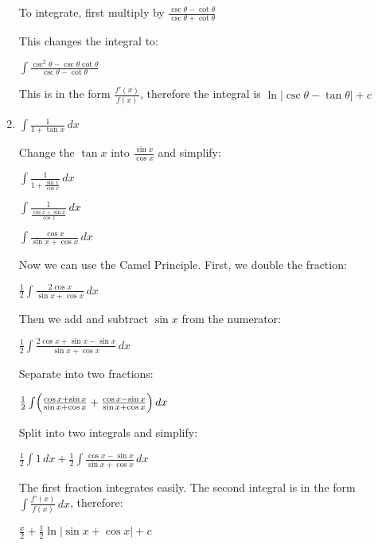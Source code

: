 \documentclass[../main.tex]{subfiles}
\begin{document}
\begin{enumerate}
    To integrate, first multiply by \(\frac{\csc{\theta}-\cot{\theta}}{\csc{\theta}+\cot{\theta}}\)

    This changes the integral to:

    \(\int \frac{\csc^2{\theta}-\csc{\theta}\cot{\theta}}{\csc{\theta}-\cot{\theta}}\)

    This is in the form \(\frac{f'(x)}{f(x)}\), therefore the integral is \(\ln{|\csc{\theta}-\tan{\theta}|}+c\)
    
    \item 
    $\int \frac{1}{1+\tan{x}}\, dx$

    Change the $\tan{x}$ into $\frac{\sin{x}}{\cos{x}}$ and simplify:

    $\int \frac{1}{1+\frac{\sin{x}}{\cos{x}}}\,dx$

    $\int \frac{1}{\frac{\cos{x}+\sin{x}}{\cos{x}}}\,dx$

    $\int \frac{\cos{x}}{\sin{x}+\cos{x}}\,dx$

    Now we can use the Camel Principle. First, we double the fraction:

    $\frac{1}{2}\int \frac{2\cos{x}}{\sin{x}+\cos{x}}\,dx$

    Then we add and subtract $\sin{x}$ from the numerator:

    $\frac{1}{2}\int \frac{2\cos{x}+\sin{x}-\sin{x}}{\sin{x}+\cos{x}}\,dx$

    Separate into two fractions:

    $\frac{1}{2}\int \Bigl(\frac{\cos{x}+\sin{x}}{\sin{x}+\cos{x}}+\frac{\cos{x}-\sin{x}}{\sin{x}+\cos{x}}\Bigr)\,dx$

    Split into two integrals and simplify:

    $\frac{1}{2}\int 1\,dx+\frac{1}{2}\int \frac{\cos{x}-\sin{x}}{\sin{x}+\cos{x}}\,dx$

    The first fraction integrates easily. The second integral is in the form $\int \frac{f'(x)}{f(x)}\, dx$, therefore:

    $\frac{x}{2}+\frac{1}{2}\ln{|\sin{x}+\cos{x}|}+c$

\end{enumerate}
\end{document}
